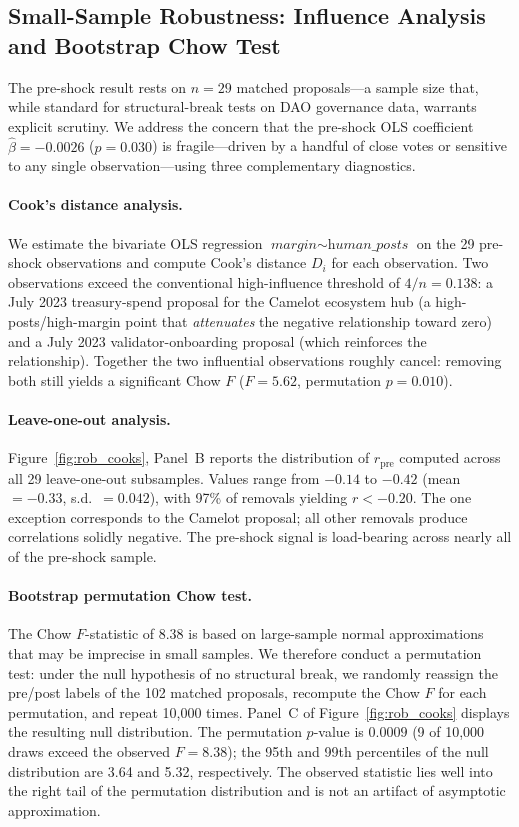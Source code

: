 \documentclass[12pt]{article}
\begin{document}
\subsection{Small-Sample Robustness: Influence Analysis and Bootstrap Chow Test}
\label{subsec:small_sample_robust}

The pre-shock result rests on $n = 29$ matched proposals---a sample size that, while
standard for structural-break tests on DAO governance data, warrants explicit scrutiny.
We address the concern that the pre-shock OLS coefficient $\hat{\beta} = -0.0026$
($p = 0.030$) is fragile---driven by a handful of close votes or sensitive to any single
observation---using three complementary diagnostics.

\paragraph{Cook's distance analysis.}
We estimate the bivariate OLS regression $\textit{margin} \sim \textit{human\_posts}$
on the 29 pre-shock observations and compute Cook's distance $D_i$ for each observation.
Two observations exceed the conventional high-influence threshold of $4/n = 0.138$:
a July 2023 treasury-spend proposal for the Camelot ecosystem hub (a high-posts/high-margin
point that \emph{attenuates} the negative relationship toward zero) and a July 2023
validator-onboarding proposal (which reinforces the relationship). Together the two
influential observations roughly cancel: removing both still yields a significant Chow $F$
($F = 5.62$, permutation $p = 0.010$).

\paragraph{Leave-one-out analysis.}
Figure~\ref{fig:rob_cooks}, Panel~B reports the distribution of $r_{\text{pre}}$
computed across all 29 leave-one-out subsamples. Values range from $-0.14$ to $-0.42$
(mean $= -0.33$, s.d.~$= 0.042$), with 97\% of removals yielding $r < -0.20$. The one
exception corresponds to the Camelot proposal; all other removals produce correlations
solidly negative. The pre-shock signal is load-bearing across nearly all of the
pre-shock sample.

\paragraph{Bootstrap permutation Chow test.}
The Chow $F$-statistic of $8.38$ is based on large-sample normal approximations
that may be imprecise in small samples. We therefore conduct a permutation test:
under the null hypothesis of no structural break, we randomly reassign the
pre/post labels of the 102 matched proposals, recompute the Chow $F$ for each
permutation, and repeat 10,000 times. Panel~C of Figure~\ref{fig:rob_cooks}
displays the resulting null distribution. The permutation $p$-value is $0.0009$
(9 of 10,000 draws exceed the observed $F = 8.38$); the 95th and 99th percentiles
of the null distribution are 3.64 and 5.32, respectively. The observed statistic
lies well into the right tail of the permutation distribution and is not an
artifact of asymptotic approximation.
\end{document}
